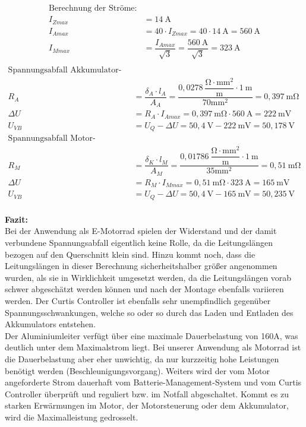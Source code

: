 \begin{align*}
\text{Berechnung der Ströme:} \\[2mm]
I_{Zmax} &= 14~\mathrm{A}	\\[3mm]
I_{Amax} &= 40 \cdot I_{Zmax} = 40 \cdot 14~\mathrm{A} = 560~\mathrm{A} \\[3mm]
I_{Mmax} &= \dfrac{I_{Amax}}{\sqrt{3}} = \dfrac{560~\mathrm{A}}{\sqrt{3}} = 323~\mathrm{A} \\[7mm]
\end{align*}
\newpage
\begin{align*}
\text{Spannungsabfall Akkumulator-Stromkreis:} \\
R_{A} &= \dfrac{\delta_{A} \cdot l_{A}}{A_{A}} = \dfrac{0,0278~\mathrm{\dfrac{\Omega \cdot mm^{2}}{m}}  \cdot 1~\mathrm{m}}{70\mathrm{mm^{2}}} = 0,397~\mathrm{m\Omega} \\[3mm]
\Delta U &= R_{A}\cdot I_{Amax} = 0,397~\mathrm{m\Omega} \cdot 560~\mathrm{A} = 222~\mathrm{mV} \\[3mm]
U_{VB} &= U_{Q} - \Delta U = 50,4~\mathrm{V} - 222~\mathrm{mV} = 50,178~\mathrm{V} \\[9mm]
\text{Spannungsabfall Motor-Stromkreis:} \\
R_{M} &= \dfrac{\delta_{K} \cdot l_{M}}{A_{M}} = \dfrac{0,01786~\mathrm{\dfrac{\Omega \cdot mm^{2}}{m}}  \cdot 1~\mathrm{m}}{35\mathrm{mm^{2}}} = 0,51~\mathrm{m\Omega} \\[3mm]
\Delta U &= R_{M}\cdot I_{Mmax} = 0,51~\mathrm{m\Omega} \cdot 323~\mathrm{A} = 165~\mathrm{mV} \\[3mm]
U_{VB} &= U_{Q} - \Delta U = 50,4~\mathrm{V} - 165~\mathrm{mV} = 50,235~\mathrm{V} \\[5mm]
\end{align*}

\textbf{Fazit:}
\\[2mm]
Bei der Anwendung als E-Motorrad spielen der Widerstand und der damit verbundene Spannungsabfall eigentlich keine Rolle, da die Leitungslängen bezogen auf den Querschnitt klein sind. Hinzu kommt noch, dass die Leitungslängen in dieser Berechnung sicherheitshalber größer angenommen wurden, als sie in Wirklichkeit umgesetzt werden, da die Leitungslängen vorab schwer abgeschätzt werden können und nach der Montage ebenfalls  variieren werden. Der Curtis Controller ist ebenfalls sehr unempfindlich gegenüber Spannungsschwankungen, welche so oder so durch das Laden und Entladen des Akkumulators entstehen. \\
Der Aluminiumleiter verfügt über eine maximale Dauerbelastung von 160A, was deutlich unter dem Maximalstrom liegt. Bei unserer Anwendung als Motorrad ist die Dauerbelastung aber eher unwichtig, da nur kurzzeitig hohe Leistungen benötigt werden (Beschleunigungsvorgang). Weiters wird der vom Motor angeforderte Strom dauerhaft vom Batterie-Management-System und vom Curtis Controller überprüft und reguliert bzw. im Notfall abgeschaltet. Kommt es zu starken Erwärmungen im Motor, der Motorsteuerung oder dem Akkumulator, wird die Maximalleistung gedrosselt.

